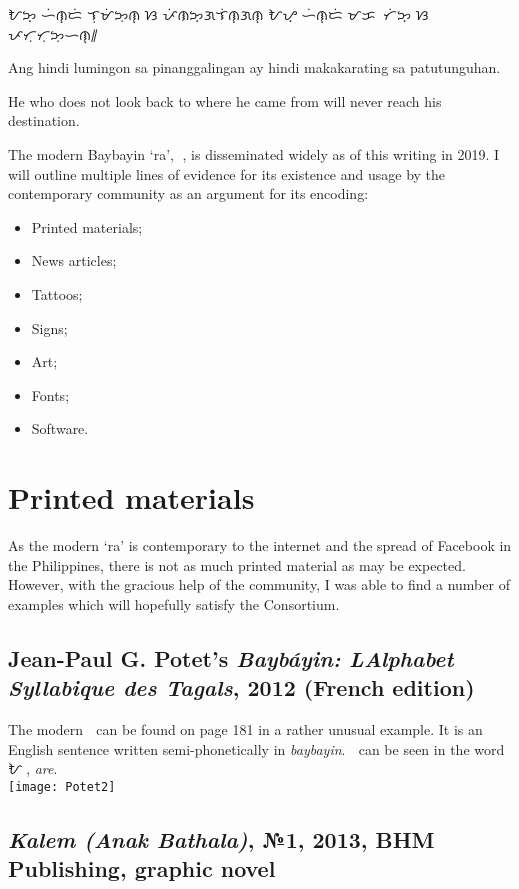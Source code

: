 \documentclass[a4paper,pagesize,openany,14pt,parskip=never]{scrbook}
\newcommand{\≈}{$\approx$}
\begin{document}
    {\baybayin ᜀᜅ᜔ ᜑᜒᜈ᜔ᜇᜒ ᜎᜓᜋᜒᜅᜓᜈ᜔ ᜐ ᜉᜒᜈᜅ᜔ᜄᜎᜒᜈ᜔ᜄᜈ᜔ ᜀᜌ᜔ ᜑᜒᜈ᜔ᜇᜒ ᜋᜃᜍᜍᜆᜒᜅ᜔ ᜐ ᜉᜆᜓᜆᜓᜅᜓᜑᜈ᜔᜶}

    Ang hindi lumingon sa pinanggalingan ay hindi makakarating sa patutunguhan.

    He who does not look back to where he came from will never reach his destination.

\newpage
{}
The modern Baybayin `ra', {\baybayin ᜍ}, is disseminated widely as of this writing in 2019. I will outline multiple lines of evidence for its existence and usage by the contemporary community as an argument for its encoding:

\begin{itemize}
    \item Printed materials;
    \item News articles;
    \item Tattoos;
    \item Signs;
    \item Art;
    \item Fonts;
    \item Software.
\end{itemize}

\section{Printed materials}

As the modern `ra' is contemporary to the internet and the spread of Facebook in the Philippines, there is not as much printed material as may be expected. However, with the gracious help of the community, I was able to find a number of examples which will hopefully satisfy the Consortium.

\subsection{Jean-Paul G. Potet's {\em Bayb\'ayin: L\textquotesingle Alphabet Syllabique des Tagals}, 2012 (French edition)}

The modern {\baybayin ᜍ} can be found on page {181} in a rather unusual example. It is an English sentence written semi-phonetically in {\em baybayin}. {\baybayin ᜍ} can be seen in the word {\baybayin ᜀᜍᜒ}, {\em are}.
 \\
\texttt{[image: Potet2]}

\subsection{{\em Kalem (Anak Bathala)}, №1, 2013, BHM Publishing, graphic novel}
\label{Kalem}
\end{document}
